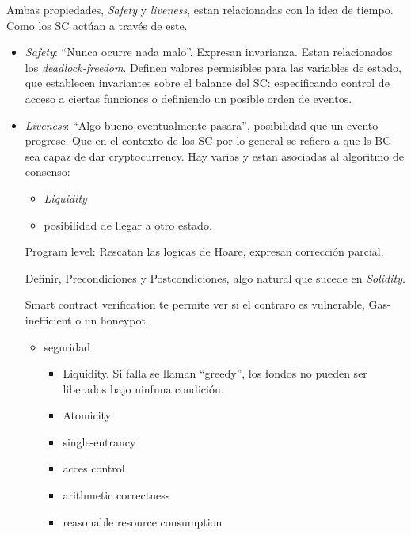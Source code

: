 Ambas propiedades, {\it Safety} y {\it liveness}, estan
relacionadas con la idea de tiempo. Como los
SC actúan a través de este.
\begin{itemize}
\item {\it Safety}: ``Nunca ocurre nada malo''. Expresan
invarianza. Estan relacionados los {\it deadlock-freedom}.
Definen valores permisibles para las variables de estado,
que establecen invariantes sobre el balance del SC:
especificando control de acceso a ciertas funciones o
definiendo un posible orden de eventos.
\item {\it Liveness}: ``Algo bueno eventualmente pasara'',
posibilidad que un evento progrese. Que en el contexto
de los SC por lo general se refiera a que
ls BC sea capaz de dar cryptocurrency. Hay varias y
estan asociadas al algoritmo de consenso: 
\begin{itemize}
\item {\it Liquidity}
\item posibilidad de llegar a otro estado.
\end{itemize}




Program level:
Rescatan las logicas de Hoare,
expresan corrección parcial.


Definir, Precondiciones y Postcondiciones,
algo natural que sucede en {\it Solidity}.

Smart contract verification te permite ver si el contraro
es vulnerable, Gas-inefficient o un honeypot.


\begin{itemize}
\item seguridad
\begin{itemize}
\item Liquidity. Si falla se llaman ``greedy'',
      los fondos no pueden ser liberados bajo ninfuna condición.
\item Atomicity
\item single-entrancy
\item acces control
\item arithmetic correctness
\item reasonable resource consumption
\end{itemize}


\end{itemize}
\end{itemize}
